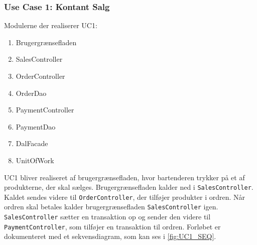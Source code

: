 \subsubsection{Use Case 1: Kontant Salg}
Modulerne der realiserer UC1:
\begin{enumerate}
	\item Brugergrænsefladen
	\item SalesController
	\item OrderController
	\item OrderDao
	\item PaymentController
	\item PaymentDao
	\item DalFacade
	\item UnitOfWork
\end{enumerate}

UC1 bliver realiseret af brugergrænsefladen, hvor bartenderen trykker på et af produkterne, der skal sælges. Brugergrænsefladen kalder ned i \texttt{SalesController}. Kaldet sendes videre til \texttt{OrderController}, der tilføjer produkter i ordren. Når ordren skal betales kalder brugergrænsefladen \texttt{SalesController} igen. \texttt{SalesController} sætter en transaktion op og sender den videre til \texttt{PaymentController}, som tilføjer en transaktion til ordren. Forløbet er dokumenteret med et sekvensdiagram, som kan ses i \ref{fig:UC1_SEQ}. 

